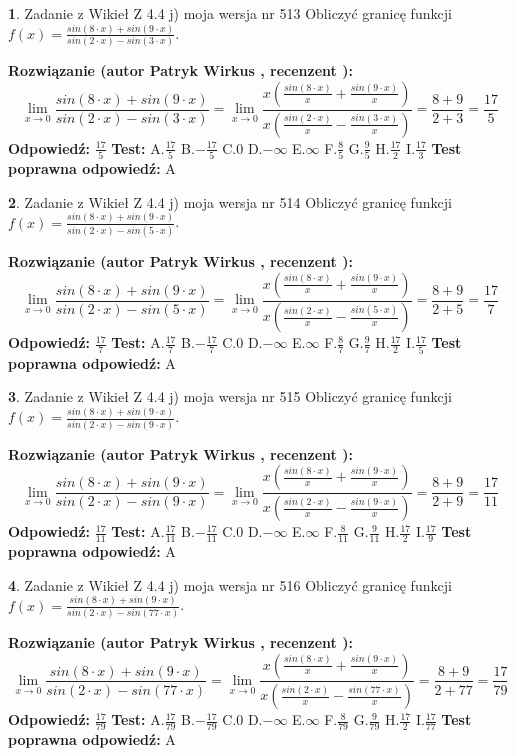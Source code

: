 \documentclass[12pt, a4paper]{article}
\theoremstyle{definition} %
\newtheorem{zad}{}
\newcommand{\zadStart}[1]{\begin{zad}#1\newline}
\newcommand{\zadStop}{\end{zad}}
\newcommand{\rozwStart}[2]{\noindent \textbf{Rozwiązanie (autor #1 , recenzent #2): }\newline}
\newcommand{\rozwStop}{\newline}
\newcommand{\odpStart}{\noindent \textbf{Odpowiedź:}\newline}
\newcommand{\odpStop}{\newline}
\newcommand{\testStart}{\noindent \textbf{Test:}\newline}
\newcommand{\testStop}{\newline}
\newcommand{\kluczStart}{\noindent \textbf{Test poprawna odpowiedź:}\newline}
\newcommand{\kluczStop}{\newline}
\begin{document}
\zadStart{Zadanie z Wikieł Z 4.4 j) moja wersja nr 513}
Obliczyć granicę funkcji $f(x)=\frac{sin(8\cdot x) +sin(9\cdot x)}{sin(2\cdot x) -sin(3\cdot x)}$.
\zadStop
\rozwStart{Patryk Wirkus}{}
$$\lim\limits_{x\to 0}\frac{sin(8\cdot x) +sin(9\cdot x)}{sin(2\cdot x) -sin(3\cdot x)}=\lim\limits_{x\to 0}\frac{x(\frac{sin(8\cdot x)}{x}+\frac{sin(9\cdot x)}{x})}{x(\frac{sin(2\cdot x)}{x}-\frac{sin(3\cdot x)}{x})}=\frac{8+9}{2+3} = \frac{17}{5}$$
\rozwStop
\odpStart
$\frac{17}{5}$
\odpStop
\testStart
A.$\frac{17}{5}$
B.$-\frac{17}{5}$
C.$0$
D.$-\infty$
E.$\infty$
F.$\frac{8}{5}$
G.$\frac{9}{5}$
H.$\frac{17}{2}$
I.$\frac{17}{3}$
\testStop
\kluczStart
A
\kluczStop



\zadStart{Zadanie z Wikieł Z 4.4 j) moja wersja nr 514}
Obliczyć granicę funkcji $f(x)=\frac{sin(8\cdot x) +sin(9\cdot x)}{sin(2\cdot x) -sin(5\cdot x)}$.
\zadStop
\rozwStart{Patryk Wirkus}{}
$$\lim\limits_{x\to 0}\frac{sin(8\cdot x) +sin(9\cdot x)}{sin(2\cdot x) -sin(5\cdot x)}=\lim\limits_{x\to 0}\frac{x(\frac{sin(8\cdot x)}{x}+\frac{sin(9\cdot x)}{x})}{x(\frac{sin(2\cdot x)}{x}-\frac{sin(5\cdot x)}{x})}=\frac{8+9}{2+5} = \frac{17}{7}$$
\rozwStop
\odpStart
$\frac{17}{7}$
\odpStop
\testStart
A.$\frac{17}{7}$
B.$-\frac{17}{7}$
C.$0$
D.$-\infty$
E.$\infty$
F.$\frac{8}{7}$
G.$\frac{9}{7}$
H.$\frac{17}{2}$
I.$\frac{17}{5}$
\testStop
\kluczStart
A
\kluczStop



\zadStart{Zadanie z Wikieł Z 4.4 j) moja wersja nr 515}
Obliczyć granicę funkcji $f(x)=\frac{sin(8\cdot x) +sin(9\cdot x)}{sin(2\cdot x) -sin(9\cdot x)}$.
\zadStop
\rozwStart{Patryk Wirkus}{}
$$\lim\limits_{x\to 0}\frac{sin(8\cdot x) +sin(9\cdot x)}{sin(2\cdot x) -sin(9\cdot x)}=\lim\limits_{x\to 0}\frac{x(\frac{sin(8\cdot x)}{x}+\frac{sin(9\cdot x)}{x})}{x(\frac{sin(2\cdot x)}{x}-\frac{sin(9\cdot x)}{x})}=\frac{8+9}{2+9} = \frac{17}{11}$$
\rozwStop
\odpStart
$\frac{17}{11}$
\odpStop
\testStart
A.$\frac{17}{11}$
B.$-\frac{17}{11}$
C.$0$
D.$-\infty$
E.$\infty$
F.$\frac{8}{11}$
G.$\frac{9}{11}$
H.$\frac{17}{2}$
I.$\frac{17}{9}$
\testStop
\kluczStart
A
\kluczStop



\zadStart{Zadanie z Wikieł Z 4.4 j) moja wersja nr 516}
Obliczyć granicę funkcji $f(x)=\frac{sin(8\cdot x) +sin(9\cdot x)}{sin(2\cdot x) -sin(77\cdot x)}$.
\zadStop
\rozwStart{Patryk Wirkus}{}
$$\lim\limits_{x\to 0}\frac{sin(8\cdot x) +sin(9\cdot x)}{sin(2\cdot x) -sin(77\cdot x)}=\lim\limits_{x\to 0}\frac{x(\frac{sin(8\cdot x)}{x}+\frac{sin(9\cdot x)}{x})}{x(\frac{sin(2\cdot x)}{x}-\frac{sin(77\cdot x)}{x})}=\frac{8+9}{2+77} = \frac{17}{79}$$
\rozwStop
\odpStart
$\frac{17}{79}$
\odpStop
\testStart
A.$\frac{17}{79}$
B.$-\frac{17}{79}$
C.$0$
D.$-\infty$
E.$\infty$
F.$\frac{8}{79}$
G.$\frac{9}{79}$
H.$\frac{17}{2}$
I.$\frac{17}{77}$
\testStop
\kluczStart
A
\kluczStop
\end{document}
